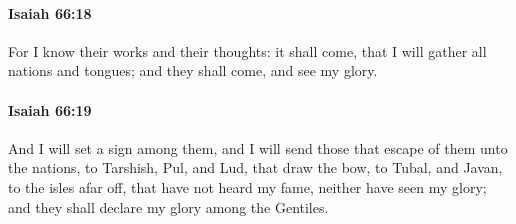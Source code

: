 		\paragraph{Isaiah 66:18} %
			\label{ISAIAH-66-18}

			For I know their works and their thoughts: it shall come, that I will gather all nations and tongues; and they shall come, and see my glory.


		\paragraph{Isaiah 66:19} %
			\label{ISAIAH-66-19}

			And I will set a sign among them, and I will send those that escape of them unto the nations, to Tarshish, Pul, and Lud, that draw the bow, to Tubal, and Javan, to the isles afar off, that have not heard my fame, neither have seen my glory; and they shall declare my glory among the Gentiles.

